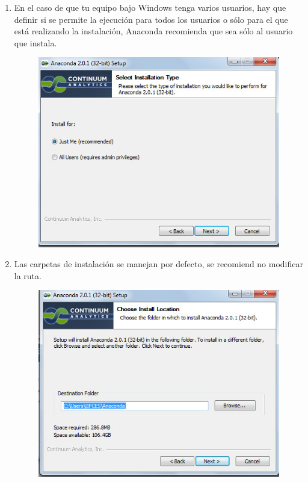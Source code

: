 \documentclass[12pt]{article}
\begin{document}
\begin{enumerate}
\begin{figure}[H]
\end{figure}
\item En el caso de que tu equipo bajo Windows tenga varios usuarios, hay que definir si se permite la ejecución para todos los usuarios o sólo para el que está realizando la instalación, Anaconda recomienda que sea sólo al usuario que instala.
\begin{figure}[H]
	\centering
	\includegraphics[scale=0.5]{Imagenes/Instalacion_Anaconda_03.jpg} 
\end{figure}
\item Las carpetas de instalación se manejan por defecto, se recomiend no modificar la ruta.
\begin{figure}[H]
	\centering
	\includegraphics[scale=0.5]{Imagenes/Instalacion_Anaconda_04.jpg} 

\end{figure}
\end{enumerate}
\end{document}
